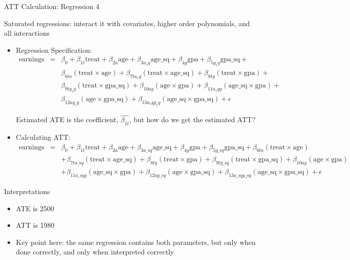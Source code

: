 \documentclass{beamer}
\begin{document}
\begin{frame}{ATT Calculation: Regression 4}


\tiny 
Saturated regressions: interact it with covariates, higher order polynomials, and all interactions


\begin{itemize}
\item Regression Specification:
\begin{eqnarray*}
\text{earnings} &=& \beta_0 + \beta_{1t} \text{treat} + \beta_{2a} \text{age} + \beta_{3a_sq} \text{age_sq} + \beta_{4g} \text{gpa} + \beta_{5g_sq} \text{gpa_sq} + \\
&& \beta_{6ta} (\text{treat} \times \text{age}) + \beta_{7ta_sq} (\text{treat} \times \text{age_sq}) + \beta_{8tg} (\text{treat} \times \text{gpa}) + \\
&& \beta_{9tg_sq} (\text{treat} \times \text{gpa_sq}) + \beta_{10ag} (\text{age} \times \text{gpa}) + \beta_{11a_sqg} (\text{age_sq} \times \text{gpa}) + \\
&& \beta_{12ag_sq} (\text{age} \times \text{gpa_sq}) + \beta_{13a_sqg_sq} (\text{age_sq} \times \text{gpa_sq}) + \epsilon
\end{eqnarray*}

\bigskip

Estimated ATE is the coefficient, $\widehat{\beta_{1t}}$, but how do we get the estimated ATT?

\item Calculating ATT:
\begin{eqnarray*}
\text{earnings} &=& \beta_0 + \beta_{1t} \text{treat} + \beta_{2a} \text{age} + \beta_{3a\_sq} \text{age\_sq} + \beta_{4g} \text{gpa} + \beta_{5g\_sq} \text{gpa\_sq} + \beta_{6ta} (\text{treat} \times \text{age})  \nonumber \\ 
&&+ \beta_{7ta\_sq} (\text{treat} \times \text{age\_sq}) + \beta_{8tg} (\text{treat} \times \text{gpa}) + \beta_{9tg\_sq} (\text{treat} \times \text{gpa\_sq}) + \beta_{10ag} (\text{age} \times \text{gpa})  \nonumber \\
&&+ \beta_{11a\_sqg} (\text{age\_sq} \times \text{gpa}) + \beta_{12ag\_sq} (\text{age} \times \text{gpa\_sq}) + \beta_{13a\_sqg\_sq} (\text{age\_sq} \times \text{gpa\_sq}) + \epsilon
\end{eqnarray*}
\end{itemize}
\end{frame}

\begin{frame}{Interpretations}

\begin{itemize}
\item ATE is 2500
\item ATT is 1980
\item Key point here: the same regression contains both parameters, but only when done correctly, and only when interpreted correctly
\end{itemize}

\end{frame}
\end{document}

